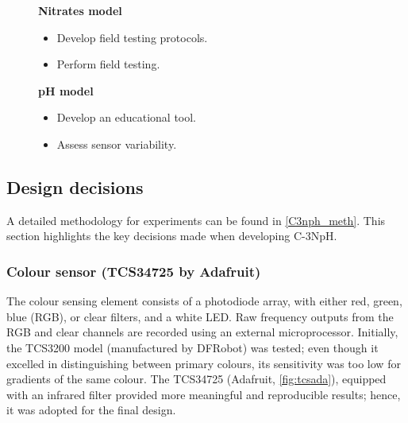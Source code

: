\begin{figure}[H]
	\centering
	\begin{minipage}[c]{0.45\textwidth}
	\begin{tcolorbox}[width=\textwidth]
 	\noindent \textbf{Nitrates model}
        \begin{itemize}
            \item Develop field testing protocols.
            \item Perform field testing.
        \end{itemize}
        \end{tcolorbox}
	\end{minipage}
		\begin{minipage}[c]{0.45\textwidth}
		\begin{tcolorbox}[width=\textwidth]
	\noindent \textbf{pH model}
        \begin{itemize}
            \item Develop an educational tool.
            \item Assess sensor variability.
        \end{itemize}
        \end{tcolorbox}
	\end{minipage}
	\end{figure}



\clearpage
\subsection{Design decisions}

A detailed methodology for experiments can be found in \cref{C3nph_meth}. This section highlights the key decisions made when developing C-3NpH.

\subsubsection{Colour sensor (TCS34725 by Adafruit)} \label{sec:cs_c3nph}

The colour sensing element consists of a photodiode array, with either red, green, blue (RGB), or clear filters, and a white LED. Raw frequency outputs from the RGB and clear channels are recorded using an external microprocessor. Initially, the TCS3200 model (manufactured by DFRobot) was tested; even though it excelled in distinguishing between primary colours, its sensitivity was too low for gradients of the same colour. The TCS34725 (Adafruit, \cref{fig:tcsada}), equipped with an infrared filter provided more meaningful and reproducible results; hence, it was adopted for the final design.\cite{ada}

